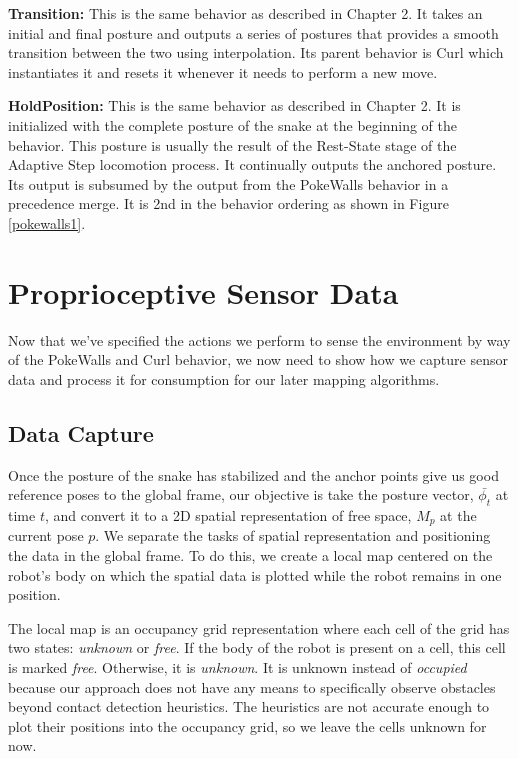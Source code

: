 \textbf{Transition:}   This is the same behavior as described in Chapter 2.  It takes an initial and final posture and outputs a series of postures that provides a smooth transition between the two using interpolation.  Its parent behavior is Curl which instantiates it and resets it whenever it needs to perform a new move.

\textbf{HoldPosition:} This is the same behavior as described in Chapter 2.  It is initialized with the complete posture of the snake at the beginning of the behavior.  This posture is usually the result of the Rest-State stage of the Adaptive Step locomotion process.  It continually outputs the anchored posture.  Its output is subsumed by the output from the PokeWalls behavior in a precedence merge.  It is 2nd in the behavior ordering as shown in Figure \ref{pokewalls1}. 




\section{Proprioceptive Sensor Data}

Now that we've specified the actions we perform to sense the environment by way of the PokeWalls and Curl behavior, we now need to show how we capture sensor data and process it for consumption for our later mapping algorithms.

\subsection{Data Capture}

Once the posture of the snake has stabilized and the anchor points give us good reference poses to the global frame, our objective is take the posture vector, $\bar{\phi_t}$ at time $t$, and convert it to a 2D spatial representation of free space, $M_p$ at the current pose $p$.  We separate the tasks of spatial representation and positioning the data in the global frame.  To do this, we create a local map centered on the robot's body on which the spatial data is plotted while the robot remains in one position.

The local map is an occupancy grid representation where each cell of the grid has two states:  \emph{unknown} or \emph{free}.  If the body of the robot is present on a cell, this cell is marked \emph{free}.  Otherwise, it is \emph{unknown}.  It is unknown instead of \emph{occupied} because our approach does not have any means to specifically observe obstacles beyond contact detection heuristics.  The heuristics are not accurate enough to plot their positions into the occupancy grid, so we leave the cells unknown for now.

